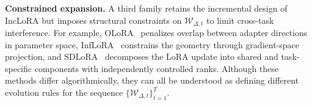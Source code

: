 \documentclass[10pt]{article} %
\begin{document}
\textbf{Constrained expansion.}
A third family retains the incremental design of IncLoRA but imposes structural constraints on $\mathcal{W}_{\Delta,t}$ to limit cross-task interference.
For example, OLoRA~\citep{wang2023orthogonal} penalizes overlap between adapter directions in parameter space, InfLoRA~\citep{Liang_2024_CVPR} constrains the geometry through gradient-space projection, and SDLoRA~\citep{wu2025sdlorascalabledecoupledlowrank} decomposes the LoRA update into shared and task-specific components with independently controlled ranks.
Although these methods differ algorithmically, they can all be understood as defining different evolution rules for the sequence $\{\mathcal{W}_{\Delta,t}\}_{t=1}^T$.



\end{document}
